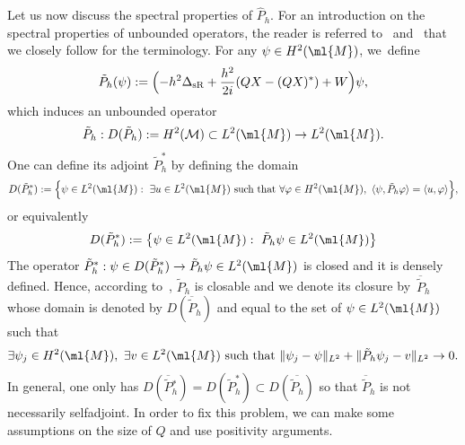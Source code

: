 \documentclass[JEP,XML,SOM,Unicode, NoEqCountersInSection,published]{cedram}
\theoremstyle{plain}
\theoremstyle{definition}
\theoremstyle{remark}
\begin{document}
Let us now discuss the spectral properties of $\widehat{P}_h$. For an introduction on the spectral properties of unbounded operators, the reader is referred to~\cite[Ch.\,VIII]{ReedSimon80} and~\cite[Ch.\,X]{ReedSimon75} that we closely follow for the terminology. For any $\psi\in H^2(\ml{M})$, we~define
\[
\tilde{P}_h(\psi):=\Bigl(-h^2\Delta_{\text{sR}}+\frac{h^2}{2i}(QX-(QX)^*)+W\Bigr)\psi,
\]
which induces an unbounded operator
\[
\tilde{P}_h:D(\tilde{P}_h):=H^2(\mathcal{M})\subset L^2(\ml{M})\to L^2(\ml{M}).
\]
One can define its adjoint $\tilde{P}_h^*$ by defining the domain
\[
D(\tilde{P}_h^*):=\Bigl\{\psi\in L^2(\ml{M}):\ \exists u\in L^2(\ml{M})\ \text{such that}\ \forall \varphi\in H^2(\ml{M}),\ \langle\psi,\tilde{P}_h\varphi\rangle=\langle u,\varphi\rangle\Bigr\},
\]
or equivalently
\[
D(\tilde{P}_h^*):=\bigl\{\psi\in L^2(\ml{M}):\ \tilde{P}_h\psi\in L^2(\ml{M})\bigr\}
\]
The operator $\tilde{P}_h^*:\psi\in D(\tilde{P}_h^*)\to \tilde{P}_h\psi \in L^2(\ml{M})$ is closed and it is densely defined. Hence, according to~\cite[Th.\,VIII.1]{ReedSimon80}, $\tilde{P}_h$ is closable and we denote its closure by~$\overline{\tilde{P}}_h$ whose domain is denoted by $D(\overline{\tilde{P}}_h)$ and equal to the set of $\psi\in L^2(\ml{M})$ such that
\[
\exists \psi_j\in H^2(\ml{M}),\ \exists v\in L^2(\ml{M})\ \text{such that}\ \|\psi_j-\psi\|_{L^2}+\|\tilde{P}_h\psi_j-v\|_{L^2}\to 0.
\]
In general, one only has $D(\overline{\tilde{P}}{}_h^*)= D(\tilde{P}_h^*)\subset D(\overline{\tilde{P}_h})$ so that $\overline{\tilde{P}}_h$ is not necessarily selfadjoint. In order to fix this problem, we can make some assumptions on the size of $Q$ and use positivity arguments.
\end{document}
